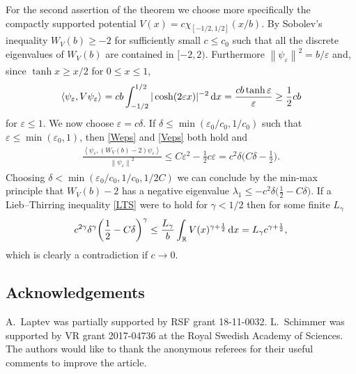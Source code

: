 \documentclass[pdftex]{sigma}%
\numberwithin{equation}{section}
\newcommand{\eps}{\varepsilon}
\newcommand{\norm}[2][]{{\left\|#2\right\|}_{#1}}
\newcommand{\R}{\mathbb{R}}
\newcommand{\sclp}[2][]{{\left\langle#2\right\rangle} _{#1}}
\begin{document}
For the second assertion of the theorem we choose more specifically the compactly supported potential $V(x)=c\chi_{[-1/2,1/2]}(x/b)$. By Sobolev's inequality $W_V(b)\ge -2$ for sufficiently small $c\le c_0$ such that all the discrete eigenvalues of $W_V(b)$ are contained in $[-2,2)$. Furthermore $\norm{\psi_\eps}^2=b/\eps$ and, since $\tanh x\ge x/2$ for $0\le x\le1$,
\begin{gather}
\sclp{\psi_\eps,V\psi_\eps}=cb\int_{-1/2}^{1/2}|\cosh(2\eps x)|^{-2}\, {\rm d} x=\frac{cb\tanh \eps}{\eps}\ge \frac12cb\label{Veps}
\end{gather}
for $\eps\le1$.
We now choose $\eps=c\delta$. If $\delta\le\min(\eps_0/c_0,1/c_0)$ such that $\eps\le\min(\eps_0,1)$, then \eqref{Weps} and \eqref{Veps} both hold and
\begin{gather*}
\frac{\sclp{\psi_\eps,(W_V(b)-2)\psi_\eps}}{\norm{\psi_\eps}^2}\le C\eps^2- \frac12c\eps=c^2\delta\bigg(C\delta-\frac{1}{2}\bigg).
\end{gather*}
Choosing $\delta<\min(\eps_0/c_0,1/c_0,1/2C)$ we can conclude by the min-max principle that $W_V(b)-2$ has a negative eigenvalue $\lambda_1\le-c^2\delta\big(\frac12-C\delta\big)$. If a Lieb--Thirring inequality \eqref{LTS} were to hold for $\gamma<1/2$ then for some finite $L_\gamma$
\begin{gather*}
c^{2\gamma}\delta^{\gamma}\bigg(\frac12-C\delta\bigg)^\gamma\le \frac{L_{\gamma}}{b}
\int_{\R} V(x)^{\gamma+\frac12}\, {\rm d} x=L_{\gamma}c^{\gamma+\frac12},
\end{gather*}
which is clearly a contradiction if $c\to0$.

\subsection*{Acknowledgements}
A.~Laptev was partially supported by RSF grant 18-11-0032. L.~Schimmer was supported by VR grant 2017-04736 at the Royal Swedish Academy of Sciences. The authors would like to thank the anonymous referees for their useful comments to improve the article.
\end{document}
